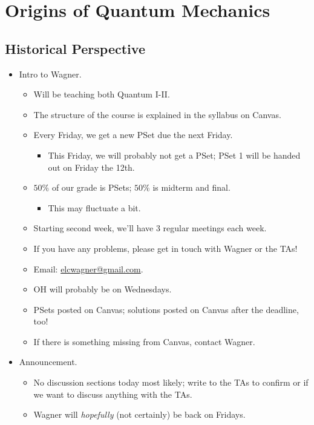 \documentclass[../notes.tex]{subfiles}
\begin{document}
\chapter{Origins of Quantum Mechanics}
\section{Historical Perspective}
\begin{itemize}
    \item {}Intro to Wagner.
    \begin{itemize}
        \item Will be teaching both Quantum I-II.
        \item The structure of the course is explained in the syllabus on Canvas.
        \item Every Friday, we get a new PSet due the next Friday.
        \begin{itemize}
            \item This Friday, we will probably not get a PSet; PSet 1 will be handed out on Friday the 12th.
        \end{itemize}
        \item $50\%$ of our grade is PSets; $50\%$ is midterm and final.
        \begin{itemize}
            \item This may fluctuate a bit.
        \end{itemize}
        \item Starting second week, we'll have 3 regular meetings each week.
        \item If you have any problems, please get in touch with Wagner or the TAs!
        \item Email: \href{mailto:elcwagner@gmail.com}{elcwagner@gmail.com}.
        \item OH will probably be on Wednesdays.
        \item PSets posted on Canvas; solutions posted on Canvas after the deadline, too!
        \item If there is something missing from Canvas, contact Wagner.
    \end{itemize}
    \item Announcement.
    \begin{itemize}
        \item No discussion sections today most likely; write to the TAs to confirm or if we want to discuss anything with the TAs.
        \item Wagner will \emph{hopefully} (not certainly) be back on Fridays.

\end{itemize}
\end{itemize}
\end{document}
